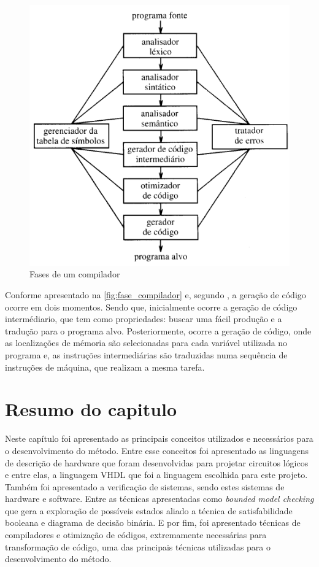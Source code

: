 \begin{figure}[H]
	\begin{center}
    \caption{\label{fig:fase_compilador}Fases de um compilador}
	\includegraphics[scale=0.70]{Figuras/fase_compilador.png}
	\end{center}
\end{figure}

\par
Conforme apresentado na \autoref{fig:fase_compilador} e, segundo , a geração de código ocorre em dois momentos. Sendo que, inicialmente ocorre a geração de código intermédiario, que tem como propriedades: buscar uma fácil produção e a tradução para o programa alvo. Posteriormente, ocorre a geração de código, onde as localizações de mémoria são selecionadas para cada variável utilizada no programa e, as instruções intermediárias são traduzidas numa sequência de instruções de máquina, que realizam a mesma tarefa.

\section{Resumo do capitulo}
\par
Neste capítulo foi apresentado as principais conceitos utilizados e necessários para o desenvolvimento do método. Entre esse conceitos foi apresentado as linguagens de descrição de hardware que foram desenvolvidas para projetar circuitos lógicos e entre elas, a linguagem VHDL que foi a linguagem escolhida para este projeto. Também foi apresentado a verificação de sistemas, sendo estes sistemas de hardware e software. Entre as técnicas apresentadas como \textit{bounded model checking} que gera a exploração de possíveis estados aliado a técnica de satisfabilidade booleana e diagrama de decisão binária. E por fim, foi apresentado técnicas de compiladores e otimização de códigos, extremamente necessárias para transformação de código, uma das principais técnicas utilizadas para o desenvolvimento do método. 